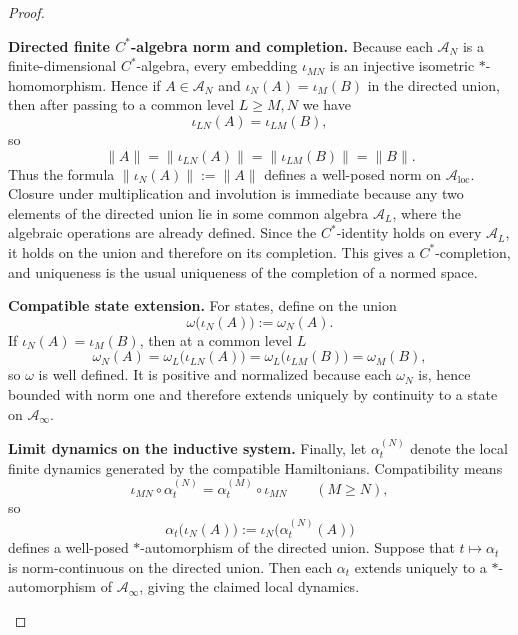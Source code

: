 \documentclass[12pt,a4paper]{article}
\begin{document}
\begin{proof}
\begin{proofsteps}

\item \textbf{Directed finite \(C^*\)-algebra norm and completion.}
Because each \(\mathcal A_N\) is a finite-dimensional $C^*$-algebra, every embedding \(\iota_{MN}\) is an injective isometric $*$-homomorphism.
Hence if \(A\in \mathcal A_N\) and \(\iota_N(A)=\iota_M(B)\) in the directed union, then after passing to a common level \(L\ge M,N\) we have
\[
\iota_{LN}(A)=\iota_{LM}(B),
\]
so
\[
\|A\|=\|\iota_{LN}(A)\|=\|\iota_{LM}(B)\|=\|B\|.
\]
Thus the formula \(\|\iota_N(A)\|:=\|A\|\) defines a well-posed norm on \(\mathcal A_{\mathrm{loc}}\).
Closure under multiplication and involution is immediate because any two elements of the directed union lie in some common algebra \(\mathcal A_L\), where the algebraic operations are already defined.
Since the $C^*$-identity holds on every \(\mathcal A_L\), it holds on the union and therefore on its completion.
This gives a $C^*$-completion, and uniqueness is the usual uniqueness of the completion of a normed space.


\item \textbf{Compatible state extension.}
For states, define on the union
\[
\omega\bigl(\iota_N(A)\bigr):=\omega_N(A).
\]
If \(\iota_N(A)=\iota_M(B)\), then at a common level \(L\)
\[
\omega_N(A)=\omega_L\bigl(\iota_{LN}(A)\bigr)=\omega_L\bigl(\iota_{LM}(B)\bigr)=\omega_M(B),
\]
so \(\omega\) is well defined.
It is positive and normalized because each \(\omega_N\) is, hence bounded with norm one and therefore extends uniquely by continuity to a state on \(\mathcal A_\infty\).

\item \textbf{Limit dynamics on the inductive system.}
Finally, let \(\alpha_t^{(N)}\) denote the local finite dynamics generated by the
compatible Hamiltonians.  Compatibility means
\[
\iota_{MN}\circ \alpha_t^{(N)} = \alpha_t^{(M)}\circ \iota_{MN}
\qquad (M\ge N),
\]
so
\[
\alpha_t\bigl(\iota_N(A)\bigr):=\iota_N\bigl(\alpha_t^{(N)}(A)\bigr)
\]
defines a well-posed \(*\)-automorphism of the directed union.  Suppose that
\(t\mapsto\alpha_t\) is norm-continuous on the directed union.  Then each
\(\alpha_t\) extends uniquely to a \(*\)-automorphism of \(\mathcal A_\infty\),
giving the claimed local dynamics.
\end{proofsteps}

\end{proof}
\end{document}
